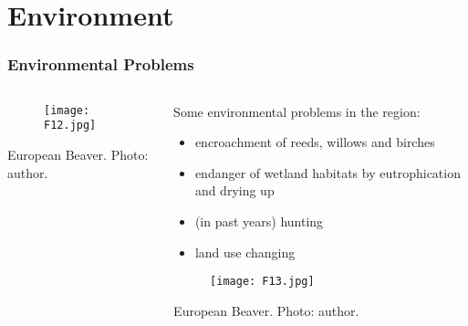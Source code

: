 \documentclass[pdflatex,compress,8pt,
	xcolor={dvipsnames,dvipsnames,svgnames,x11names,table},
	hyperref={colorlinks = true,
	breaklinks = true, urlcolor = NavyBlue, breaklinks = true}]{beamer}
\begin{document}
\section{Environment}
\begin{frame}\frametitle{Environmental Problems}
\begin{minipage}[0.4\textheight]{\textwidth}
\begin{columns}[T]
\begin{column}{0.5\textwidth}
\vspace{2em}
\begin{figure}[H]
	\centering
		\texttt{[image: F12.jpg]}
\end{figure}
\footnotesize{European Beaver. Photo: author.}
\end{column}
\begin{column}{0.5\textwidth}
\vspace{2em} 
Some environmental problems in the region: 
\begin{itemize}
	\item encroachment of reeds, willows and birches
	\item endanger of wetland habitats by eutrophication and drying up
	\item (in past years) hunting 
	\item land use changing
\end{itemize}
\begin{figure}[H]
	\centering
		\texttt{[image: F13.jpg]}
\end{figure}
\footnotesize{European Beaver. Photo: author.}
\end{column}
\end{columns}
\end{minipage}
\end{frame}
\end{document}
